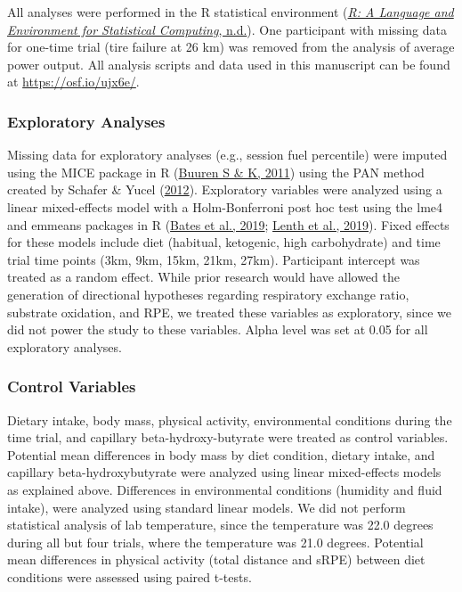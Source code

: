 \documentclass[]{cik}%
\begin{document}
All analyses were performed in the R statistical environment
(\protect\hyperlink{ref-31}{\emph{R: A Language and Environment for
Statistical Computing}, n.d.}). One participant with missing data for
one-time trial (tire failure at 26 km) was removed from the analysis of
average power output. All analysis scripts and data used in this
manuscript can be found at \url{https://osf.io/ujx6e/}.

\hypertarget{exploratory-analyses}{%
\subsubsection{Exploratory Analyses}\label{exploratory-analyses}}

Missing data for exploratory analyses (e.g., session fuel percentile)
were imputed using the MICE package in R
(\protect\hyperlink{ref-48}{Buuren S \& K, 2011}) using the PAN method
created by Schafer \& Yucel (\protect\hyperlink{ref-49}{2012}).
Exploratory variables were analyzed using a linear mixed-effects model
with a Holm-Bonferroni post hoc test using the lme4 and emmeans packages
in R (\protect\hyperlink{ref-50}{Bates et al., 2019};
\protect\hyperlink{ref-51}{Lenth et al., 2019}). Fixed effects for these
models include diet (habitual, ketogenic, high carbohydrate) and time
trial time points (3km, 9km, 15km, 21km, 27km). Participant intercept
was treated as a random effect. While prior research would have allowed
the generation of directional hypotheses regarding respiratory exchange
ratio, substrate oxidation, and RPE, we treated these variables as
exploratory, since we did not power the study to these variables. Alpha
level was set at 0.05 for all exploratory analyses.

\hypertarget{control-variables}{%
\subsubsection{Control Variables}\label{control-variables}}

Dietary intake, body mass, physical activity, environmental conditions
during the time trial, and capillary beta-hydroxy-butyrate were treated
as control variables. Potential mean differences in body mass by diet
condition, dietary intake, and capillary beta-hydroxybutyrate were
analyzed using linear mixed-effects models as explained above.
Differences in environmental conditions (humidity and fluid intake),
were analyzed using standard linear models. We did not perform
statistical analysis of lab temperature, since the temperature was 22.0
degrees during all but four trials, where the temperature was 21.0
degrees. Potential mean differences in physical activity (total distance
and sRPE) between diet conditions were assessed using paired t-tests.
\end{document}
